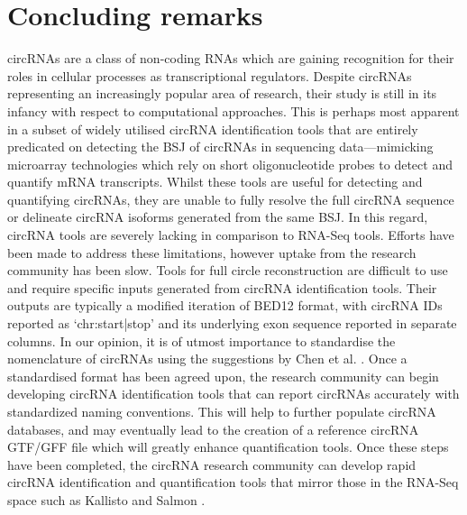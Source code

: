\documentclass[journal,review,submit,pdftex,moreauthors]{Definitions/mdpi}
\begin{document}
\section{Concluding remarks}
circRNAs are a class of non-coding RNAs which are gaining recognition for their roles in cellular processes as transcriptional regulators. Despite circRNAs representing an increasingly popular area of research, their study is still in its infancy with respect to computational approaches. This is perhaps most apparent in a subset of widely utilised circRNA identification tools that are entirely predicated on detecting the BSJ of circRNAs in sequencing data---mimicking microarray technologies which rely on short oligonucleotide probes to detect and quantify mRNA transcripts. Whilst these tools are useful for detecting and quantifying circRNAs, they are unable to fully resolve the full circRNA sequence or delineate circRNA isoforms generated from the same BSJ. In this regard, circRNA tools are severely lacking in comparison to RNA-Seq tools. Efforts have been made to address these limitations, however uptake from the research community has been slow. Tools for full circle reconstruction are difficult to use and require specific inputs generated from circRNA identification tools. Their outputs are typically a modified iteration of BED12 format, with circRNA IDs reported as `chr:start|stop' and its underlying exon sequence reported in separate columns. In our opinion, it is of utmost importance to standardise the nomenclature of circRNAs using the suggestions by Chen et al. \cite{Chen2023Jan}. Once a standardised format has been agreed upon, the research community can begin developing circRNA identification tools that can report circRNAs accurately with standardized naming conventions. This will help to further populate circRNA databases, and may eventually lead to the creation of a reference circRNA GTF/GFF file which will greatly enhance quantification tools. Once these steps have been completed, the circRNA research community can develop rapid circRNA identification and quantification tools that mirror those in the RNA-Seq space such as Kallisto \cite{kallisto} and Salmon \cite{salmon}. \par




\end{document}
